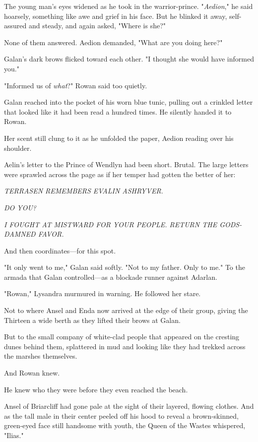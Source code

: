 The young man's eyes widened as he took in the warrior-prince. "\emph{Aedion}," he said hoarsely, something like awe and grief in his face. But he blinked it away, self-assured and steady, and again asked, "Where is she?"

None of them answered. Aedion demanded, "What are you doing here?"

Galan's dark brows flicked toward each other. "I thought she would have informed you."

"Informed us of \emph{what}?" Rowan said too quietly.

Galan reached into the pocket of his worn blue tunic, pulling out a crinkled letter that looked like it had been read a hundred times. He silently handed it to Rowan.

Her scent still clung to it as he unfolded the paper, Aedion reading over his shoulder.

Aelin's letter to the Prince of Wendlyn had been short. Brutal. The large letters were sprawled across the page as if her temper had gotten the better of her:

\emph{TERRASEN REMEMBERS EVALIN ASHRYVER.}

\emph{DO YOU?}

\emph{I FOUGHT AT MISTWARD FOR YOUR PEOPLE. RETURN THE GODS-DAMNED FAVOR.}

And then coordinates---for this spot.

"It only went to me," Galan said softly. "Not to my father. Only to me." To the armada that Galan controlled---as a blockade runner against Adarlan.

"Rowan," Lysandra murmured in warning. He followed her stare.

Not to where Ansel and Enda now arrived at the edge of their group, giving the Thirteen a wide berth as they lifted their brows at Galan.

But to the small company of white-clad people that appeared on the cresting dunes behind them, splattered in mud and looking like they had trekked across the marshes themselves.

And Rowan knew.

He knew who they were before they even reached the beach.

Ansel of Briarcliff had gone pale at the sight of their layered, flowing clothes. And as the tall male in their center peeled off his hood to reveal a brown-skinned, green-eyed face still handsome with youth, the Queen of the Wastes whispered, "Ilias."

